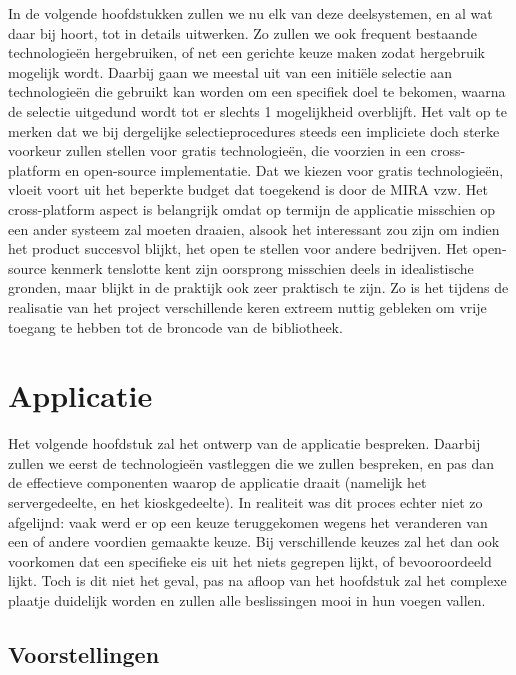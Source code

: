 In de volgende hoofdstukken zullen we nu elk van deze deelsystemen, en al wat daar bij hoort, tot in details uitwerken. Zo zullen we ook frequent bestaande technologieën hergebruiken, of net een gerichte keuze maken zodat hergebruik mogelijk wordt. Daarbij gaan we meestal uit van een initiële selectie aan technologieën die gebruikt kan worden om een specifiek doel te bekomen, waarna de selectie uitgedund wordt tot er slechts 1 mogelijkheid overblijft. Het valt op te merken dat we bij dergelijke selectieprocedures steeds een impliciete doch sterke voorkeur zullen stellen voor gratis technologieën, die voorzien in een cross-platform en open-source implementatie. Dat we kiezen voor gratis technologieën, vloeit voort uit het beperkte budget dat toegekend is door de MIRA vzw. Het cross-platform aspect is belangrijk omdat op termijn de applicatie misschien op een ander systeem zal moeten draaien, alsook het interessant zou zijn om indien het product succesvol blijkt, het open te stellen voor andere bedrijven. Het open-source kenmerk tenslotte kent zijn oorsprong misschien deels in idealistische gronden, maar blijkt in de praktijk ook zeer praktisch te zijn. Zo is het tijdens de realisatie van het project verschillende keren extreem nuttig gebleken om vrije toegang te hebben tot de broncode van de bibliotheek.


%
%

\chapter{Applicatie}
\label{chap:applicatie}

Het volgende hoofdstuk zal het ontwerp van de applicatie bespreken. Daarbij zullen we eerst de technologieën vastleggen die we zullen bespreken, en pas dan de effectieve componenten waarop de applicatie draait (namelijk het servergedeelte, en het kioskgedeelte). In realiteit was dit proces echter niet zo afgelijnd: vaak werd er op een keuze teruggekomen wegens het veranderen van een of andere voordien gemaakte keuze. Bij verschillende keuzes zal het dan ook voorkomen dat een specifieke eis uit het niets gegrepen lijkt, of bevooroordeeld lijkt. Toch is dit niet het geval, pas na afloop van het hoofdstuk zal het complexe plaatje duidelijk worden en zullen alle beslissingen mooi in hun voegen vallen.

\section{Voorstellingen}
\label{sec:voorstellingen}


